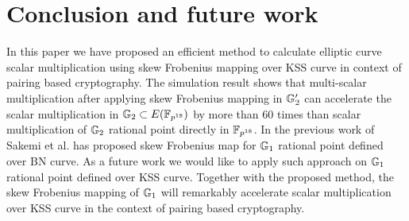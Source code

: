 \section{Conclusion and future work}
In this paper we have proposed an efficient method to calculate elliptic curve scalar multiplication using skew Frobenius mapping  over KSS curve in context of pairing based cryptography. 
The simulation result shows that multi-scalar multiplication after applying skew Frobenius mapping in ${\mathbb{G}}_{2}'$ can accelerate the scalar multiplication in ${\mathbb{G}}_{2} \subset E(\mathbb{F}_{p^{18}})$ by more than 60 times than scalar multiplication of ${\mathbb{G}}_{2}$ rational point directly in $\mathbb{F}_{p^{18}}$. 
In the previous work of Sakemi et al. \cite{sakemi_skew} has proposed skew Frobenius map for ${\mathbb{G}}_{1}$ rational point defined over BN curve. 
As a future work we would like to apply such approach on ${\mathbb{G}}_{1}$ rational point defined over KSS curve.
Together with the proposed method, the skew Frobenius mapping of ${\mathbb{G}}_{1}$ will remarkably accelerate scalar multiplication over KSS curve in the context of pairing based cryptography. 
